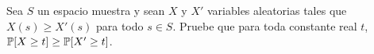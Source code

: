 \begin{statement}{14}
  Sea $S$ un espacio muestra y sean $X$ y $X'$ variables aleatorias tales que
  $X(s) \geq X'(s)$ para todo $s \in S$. Pruebe que para toda constante real $t$,
  $\mathbb{P}[X \geq t] \geq \mathbb{P}[X' \geq t]$.
\end{statement}